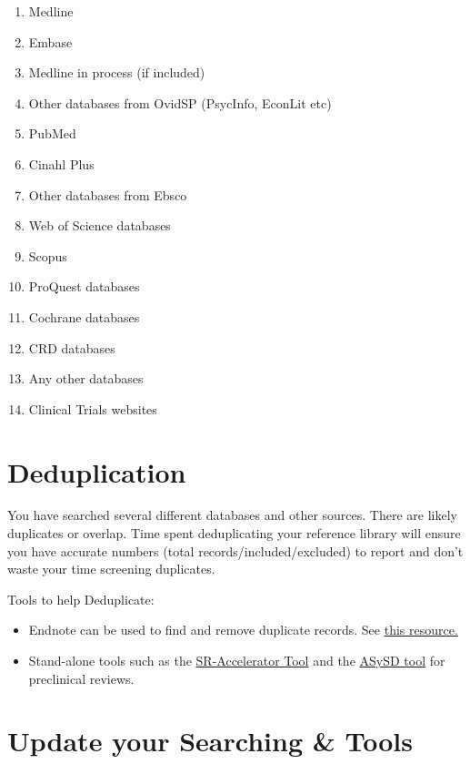 \documentclass[
]{book}
\providecommand{\tightlist}{%
  \setlength{\itemsep}{0pt}\setlength{\parskip}{0pt}}
\begin{document}
\begin{enumerate}
\def\labelenumi{\arabic{enumi}.}
\tightlist
\item
  Medline
\item
  Embase
\item
  Medline in process (if included)
\item
  Other databases from OvidSP (PsycInfo, EconLit etc)
\item
  PubMed
\item
  Cinahl Plus
\item
  Other databases from Ebsco
\item
  Web of Science databases
\item
  Scopus
\item
  ProQuest databases
\item
  Cochrane databases
\item
  CRD databases
\item
  Any other databases
\item
  Clinical Trials websites
\end{enumerate}

\hypertarget{deduplication}{%
\section{Deduplication}\label{deduplication}}

You have searched several different databases and other sources. There are likely duplicates or overlap. Time spent deduplicating your reference library will ensure you have accurate numbers (total records/included/excluded) to report and don't waste your time screening duplicates.

Tools to help Deduplicate:

\begin{itemize}
\tightlist
\item
  Endnote can be used to find and remove duplicate records. See \href{10.3163/1536-5050.104.3.014}{this resource.}
\item
  Stand-alone tools such as the \href{https://doi.org/10.1186/2046-4053-4-6}{SR-Accelerator Tool} and the \href{https://camarades.shinyapps.io/RDedup/}{ASySD tool} for preclinical reviews.
\end{itemize}

\hypertarget{update-your-searching-tools}{%
\section{Update your Searching \& Tools}\label{update-your-searching-tools}}
\end{document}
